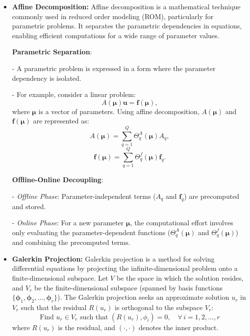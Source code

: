 \documentclass[11pt]{article}
\begin{document}
\begin{itemize}
    \item \textbf{Affine Decomposition:} Affine decomposition is a mathematical technique commonly used in reduced order modeling (ROM), particularly for parametric problems. It separates the parametric dependencies in equations, enabling efficient computations for a wide range of parameter values.

    \textbf{Parametric Separation}:
    
       - A parametric problem is expressed in a form where the parameter dependency is isolated.
       
       - For example, consider a linear problem:
         \[
         A(\boldsymbol{\mu}) \mathbf{u} = \mathbf{f}(\boldsymbol{\mu}),
         \]
         where \(\boldsymbol{\mu}\) is a vector of parameters. Using affine decomposition, \(A(\boldsymbol{\mu})\) and \(\mathbf{f}(\boldsymbol{\mu})\) are represented as:
         \[
         A(\boldsymbol{\mu}) = \sum_{q=1}^Q \Theta_q^A(\boldsymbol{\mu}) A_q,
         \]
         \[
         \mathbf{f}(\boldsymbol{\mu}) = \sum_{q=1}^Q \Theta_q^f(\boldsymbol{\mu}) \mathbf{f}_q.
         \]
    
    \textbf{Offline-Online Decoupling}:
    
       - \textit{Offline Phase}: Parameter-independent terms (\(A_q\) and \(\mathbf{f}_q\)) are precomputed and stored.
       
       - \textit{Online Phase}: For a new parameter \(\boldsymbol{\mu}\), the computational effort involves only evaluating the parameter-dependent functions (\(\Theta_q^A(\boldsymbol{\mu})\) and \(\Theta_q^f(\boldsymbol{\mu})\)) and combining the precomputed terms.
    
    \item \textbf{Galerkin Projection:} Galerkin projection is a method for solving differential equations by projecting the infinite-dimensional problem onto a finite-dimensional subspace. Let \( V \) be the space in which the solution resides, and \( V_r \) be the finite-dimensional subspace (spanned by basis functions \( \{ \boldsymbol\phi_1, \boldsymbol\phi_2, \ldots, \boldsymbol\phi_r \} \)). The Galerkin projection seeks an approximate solution \( u_r \) in \( V_r \) such that the residual \( R(u_r) \) is orthogonal to the subspace \( V_r \):
    \[
    \text{Find } u_r \in V_r \text{ such that } \left( R(u_r), \phi_i \right) = 0, \quad \forall \, i = 1, 2, \ldots, r
    \]
    where \( R(u_r) \) is the residual, and \( \left( \cdot, \cdot \right) \) denotes the inner product.


\end{itemize}
\end{document}
